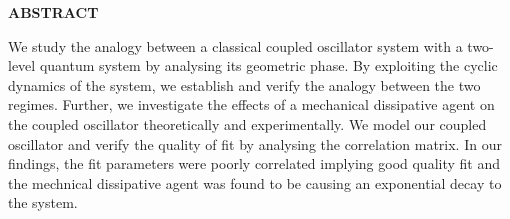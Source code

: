 \begin{center}
{\large {\bf  ABSTRACT }}

We study the analogy between a classical coupled oscillator system with a two-level quantum system by analysing its geometric phase. By exploiting the cyclic dynamics of the system, we establish and verify the analogy between the two regimes. Further, we investigate the effects of a mechanical dissipative agent on the coupled oscillator theoretically and experimentally. We model our coupled oscillator and verify the quality of fit by analysing the correlation matrix. In our findings, the fit parameters were poorly correlated implying good quality fit and the mechnical dissipative agent was found to be causing an exponential decay to the system.
\end{center}  


    

